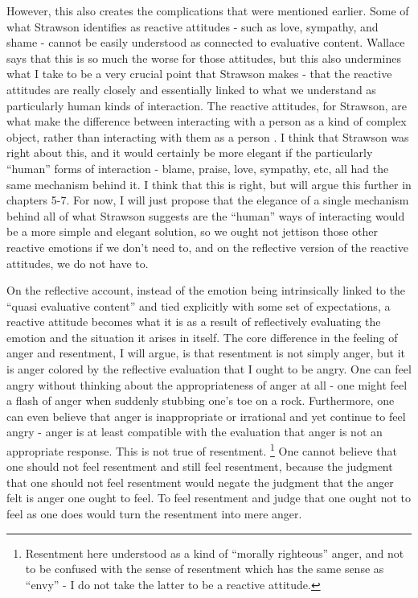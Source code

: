 \documentclass[phd,12pt,oneside,paper=letterpaper]{ubcthesis}
\begin{document}
However, this also creates the complications that were mentioned earlier. Some of what Strawson identifies as reactive attitudes - such as love, sympathy, and shame - cannot be easily understood as connected to evaluative content. Wallace says that this is so much the worse for those attitudes, but this also undermines what I take to be a very crucial point that Strawson makes - that the reactive attitudes are really closely and essentially linked to what we understand as particularly human kinds of interaction. The reactive attitudes, for Strawson, are what make the difference between interacting with a person as a kind of complex object, rather than interacting with them as a person \citep[p.9]{strawsonp1974}. I think that Strawson was right about this, and it would certainly be more elegant if the particularly ``human'' forms of interaction - blame, praise, love, sympathy, etc, all had the same mechanism behind it. I think that this is right, but will argue this further in chapters 5-7. For now, I will just propose that the elegance of a single mechanism behind all of what Strawson suggests are the ``human'' ways of interacting would be a more simple and elegant solution, so we ought not jettison those other reactive emotions if we don't need to, and on the reflective version of the reactive attitudes, we do not have to. 

On the reflective account, instead of the emotion being intrinsically linked to the ``quasi evaluative content'' and tied explicitly with some set of expectations, a reactive attitude becomes what it is as a result of reflectively evaluating the emotion and the situation it arises in itself. The core difference in the feeling of anger and resentment, I will argue, is that resentment is not simply anger, but it is anger colored by the reflective evaluation that I ought to be angry. One can feel angry without thinking about the appropriateness of anger at all - one might feel a flash of anger when suddenly stubbing one's toe on a rock. Furthermore, one can even believe that anger is inappropriate or irrational and yet continue to feel angry - anger is at least compatible with the evaluation that anger is not an appropriate response. This is not true of resentment. \footnote{Resentment here understood as a kind of ``morally righteous'' anger, and not to be confused with the sense of resentment which has the same sense as ``envy'' -  I do not take the latter to be a reactive attitude.} One cannot believe that one should not feel resentment and still feel resentment, because the judgment that one should not feel resentment would negate the judgment that the anger felt is anger one ought to feel. To feel resentment and judge that one ought not to feel as one does would turn the resentment into mere anger.
\end{document}
